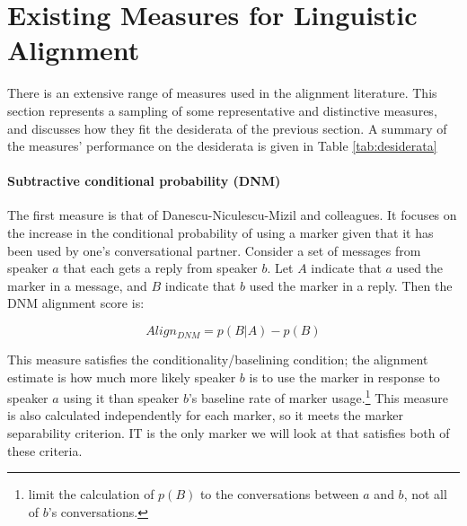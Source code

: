 \documentclass{acm_proc_article-sp}
\begin{document}

\section{Existing Measures for Linguistic Alignment}
There is an extensive range of measures used in the alignment literature.  This section represents a sampling of some representative and distinctive measures, and discusses how they fit the desiderata of the previous section.  A summary of the measures' performance on the desiderata is given in Table \ref{tab:desiderata}

\paragraph{Subtractive conditional probability (DNM)} The first measure is that of Danescu-Niculescu-Mizil and colleagues.\cite{DNMGamonDumais2011} It focuses on the increase in the conditional probability of using a marker given that it has been used by one's conversational partner.  Consider a set of messages from speaker $a$ that each gets a reply from speaker $b$.  Let $A$ indicate that $a$ used the marker in a message, and $B$ indicate that $b$ used the marker in a reply.  Then the DNM alignment score is:

\begin{equation}
Align_{DNM} = p(B|A) - p(B)
\end{equation}

This measure satisfies the conditionality/baselining condition; the alignment estimate is how much more likely speaker $b$ is to use the marker in response to speaker $a$ using it than speaker $b$'s baseline rate of marker usage.\footnote{\cite{DNMGamonDumais2011} limit the calculation of $p(B)$ to the conversations between $a$ and $b$, not all of $b$'s conversations.}  This measure is also calculated independently for each marker, so it meets the marker separability criterion.  IT is the only marker we will look at that satisfies both of these criteria.
\end{document}
